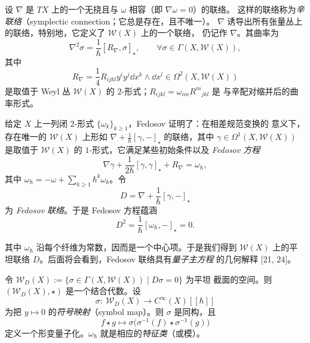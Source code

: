 设 $\nabla$ 是 $TX$ 上的一个无挠且与 $\omega$ 相容（即 $\nabla\omega=0$）的联络。
这样的联络称为\emph{辛联络}（symplectic connection；它总是存在，且不唯一）。
$\nabla$ 诱导出所有张量丛上的联络，特别地，它定义了 $\mathcal{W}(X)$ 上的一个联络，
仍记作 $\nabla$。其曲率为
\[
  \nabla^{2}\sigma=\frac{1}{\hbar}[R_{\nabla},\sigma]_{\star},
  \qquad \forall\sigma\in\Gamma(X,\mathcal{W}(X)),
\]
其中
\[
  R_{\nabla}=\frac14 R_{ijkl}y^{i}y^{j}\dd x^{k}\wedge\dd x^{l}
  \in\Omega^{2}(X,\mathcal{W}(X))
\]
是取值于 Weyl 丛 $\mathcal{W}(X)$ 的 $2$-形式；$R_{ijkl}=\omega_{im}R^{m}{}_{jkl}$ 是
与辛配对缩并后的曲率形式。

给定 $X$ 上一列闭 $2$-形式 $\{\omega_k\}_{k\ge1}$，Fedosov 证明了：在相差规范变换的
意义下，存在唯一的 $\mathcal{W}(X)$ 上形如 $\nabla+\frac{1}{\hbar}[\gamma,-]_{\star}$
的联络，其中 $\gamma\in\Omega^{1}(X,\mathcal{W}(X))$ 是取值于 $\mathcal{W}(X)$ 的
$1$-形式，它满足某些初始条件以及 \emph{Fedosov 方程}
\[
  \nabla\gamma+\frac{1}{2\hbar}[\gamma,\gamma]_{\star}+R_{\nabla}=\omega_{\hbar},
\]
其中 $\omega_{\hbar}=-\omega+\sum_{k\ge1}\hbar^{k}\omega_k$。令
\[
  D=\nabla+\frac{1}{\hbar}[\gamma,-]_{\star}
\]
为 \emph{Fedosov 联络}。于是 Fedosov 方程蕴涵
\[
  D^{2}=\frac{1}{\hbar}[\omega_{\hbar},-]_{\star}=0.
\]

其中 $\omega_{\hbar}$ 沿每个纤维为常数，因而是一个中心项。于是我们得到
$\mathcal{W}(X)$ 上的平坦联络 $D$。后面将会看到，Fedosov 联络具有\emph{量子主方程}
的几何解释 \textup{[21, 24]}。

令 $\mathcal{W}_{D}(X):=\{\sigma\in\Gamma(X,\mathcal{W}(X))\mid D\sigma=0\}$ 为平坦
截面的空间。则 $(\mathcal{W}_{D}(X),\star)$ 是一个结合代数。设
\[
  \sigma:\ \mathcal{W}_{D}(X)\longrightarrow C^{\infty}(X)[[\hbar]]
\]
为把 $y\mapsto0$ 的\emph{符号映射}（symbol map）。则 $\sigma$ 是同构，且
\[
  f\star g\mapsto\sigma\big(\sigma^{-1}(f)\star\sigma^{-1}(g)\big)
\]
定义一个形变量子化。$\omega_{\hbar}$ 就是相应的\emph{特征类}（或模）。


